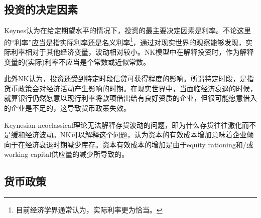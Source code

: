 \subsection{投资的决定因素}
\label{KNK-K-investment}
Keynes认为在给定期望水平的情况下，投资的最主要决定因素是利率。不论这里的“利率”应当是指实际利率还是名义利率\footnote{目前经济学界通常认为，实际利率更为恰当。}，通过对现实世界的观察能够发现，实际利率相对于其他经济变量，波动相对较小。NK模型中在解释投资时，作为解释变量的(实际)利率不应当是个常数或近似常数。

此外NK认为，投资还受到特定时段信贷可获得程度的影响。所谓特定时段，是指货币政策会对经济活动产生影响的时期。在现实世界中，当面临经济衰退的时候，就算银行仍然愿意以现行利率将款项借出给有良好资质的企业，但很可能愿意借入的企业是不足的，这导致货币政策失效。

Keynesian-neoclassical理论无法解释存货波动的问题，即为什么存货往往激化而不是缓和经济波动。NK可以解释这个问题，认为资本的有效成本增加意味着企业倾向于在经济衰退时期减少库存。资本有效成本的增加是由于equity rationing和/或working capital供应量的减少所导致的。

\subsection{货币政策}

